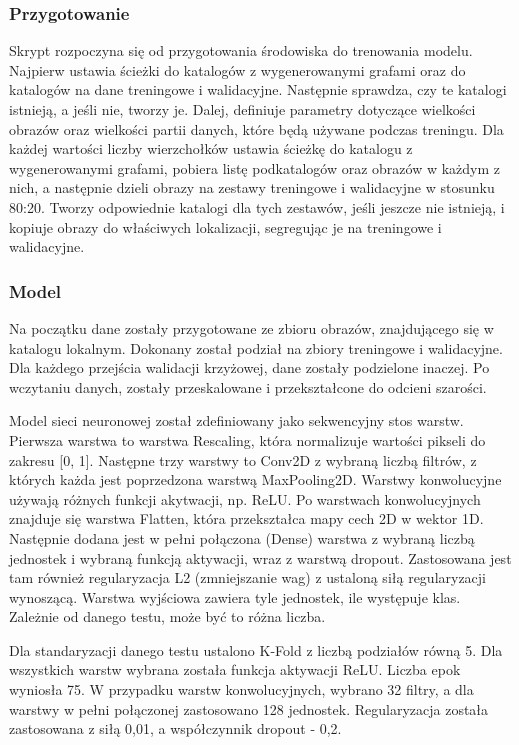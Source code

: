 \subsubsection{Przygotowanie}
Skrypt rozpoczyna się od przygotowania środowiska do trenowania modelu.
Najpierw ustawia ścieżki do katalogów z wygenerowanymi grafami oraz do katalogów na dane treningowe i walidacyjne.
Następnie sprawdza, czy te katalogi istnieją, a jeśli nie, tworzy je.
Dalej, definiuje parametry dotyczące wielkości obrazów oraz wielkości partii danych, które będą używane podczas treningu.
Dla każdej wartości liczby wierzchołków ustawia ścieżkę do katalogu z wygenerowanymi grafami,
pobiera listę podkatalogów oraz obrazów w każdym z nich,
a następnie dzieli obrazy na zestawy treningowe i walidacyjne w stosunku 80:20.
Tworzy odpowiednie katalogi dla tych zestawów, jeśli jeszcze nie istnieją,
i kopiuje obrazy do właściwych lokalizacji, segregując je na treningowe i walidacyjne.

\subsubsection{Model}
Na początku dane zostały przygotowane ze zbioru obrazów, znajdującego się w katalogu lokalnym.
Dokonany został podział na zbiory treningowe i walidacyjne.
Dla każdego przejścia walidacji krzyżowej, dane zostały podzielone inaczej.
Po wczytaniu danych, zostały przeskalowane i przekształcone do odcieni szarości.

Model sieci neuronowej został zdefiniowany jako sekwencyjny stos warstw.
Pierwsza warstwa to warstwa Rescaling, która normalizuje wartości pikseli do zakresu [0, 1].
Następne trzy warstwy to Conv2D z wybraną liczbą filtrów, z których każda jest poprzedzona warstwą MaxPooling2D.
Warstwy konwolucyjne używają różnych funkcji akytwacji, np. ReLU.
Po warstwach konwolucyjnych znajduje się warstwa Flatten, która przekształca mapy cech 2D w wektor 1D.
Następnie dodana jest w pełni połączona (Dense) warstwa z wybraną liczbą jednostek
i wybraną funkcją aktywacji, wraz z warstwą dropout.
Zastosowana jest tam również regularyzacja L2 (zmniejszanie wag) z ustaloną siłą regularyzacji wynoszącą.
Warstwa wyjściowa zawiera tyle jednostek, ile występuje klas.
Zależnie od danego testu, może być to różna liczba.

Dla standaryzacji danego testu ustalono K-Fold z liczbą podziałów równą 5.
Dla wszystkich warstw wybrana została funkcja aktywacji ReLU.
Liczba epok wyniosła 75.
W przypadku warstw konwolucyjnych, wybrano 32 filtry, a dla warstwy w pełni połączonej zastosowano 128 jednostek.
Regularyzacja została zastosowana z siłą 0,01, a współczynnik dropout - 0,2.

